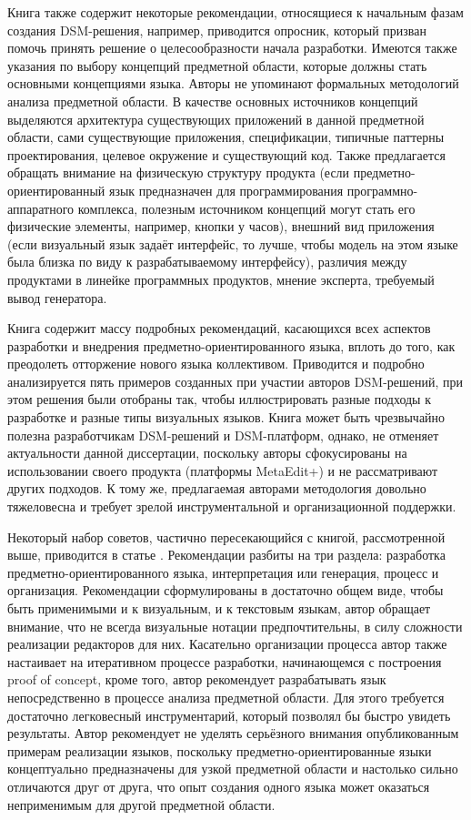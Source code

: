 Книга также содержит некоторые рекомендации, относящиеся к начальным фазам создания 
DSM-решения, например, приводится опросник, который призван помочь принять решение о 
целесообразности начала разработки. Имеются также указания по выбору концепций предметной 
области, которые должны стать основными концепциями языка. Авторы не упоминают формальных 
методологий анализа предметной области. В качестве основных источников концепций выделяются 
архитектура существующих приложений в данной предметной области, сами существующие приложения, 
спецификации, типичные паттерны проектирования, целевое окружение и существующий код.
 Также предлагается обращать внимание на физическую структуру продукта (если предметно-ориентированный 
язык предназначен для программирования программно-аппаратного комплекса, полезным 
источником концепций могут стать его физические элементы, например, кнопки у часов), 
внешний вид приложения (если визуальный язык задаёт интерфейс, то лучше, чтобы модель 
на этом языке была близка по виду к разрабатываемому интерфейсу), различия между продуктами 
в линейке программных продуктов, мнение эксперта, требуемый вывод генератора.

Книга содержит массу подробных рекомендаций, касающихся всех аспектов разработки и 
внедрения предметно-ориентированного языка, вплоть до того, как преодолеть отторжение 
нового языка коллективом. Приводится и подробно анализируется пять примеров созданных 
при участии авторов DSM-решений, при этом решения были отобраны так, чтобы иллюстрировать 
разные подходы к разработке и разные типы визуальных языков. Книга может быть чрезвычайно 
полезна разработчикам DSM-решений и DSM-платформ, однако, не отменяет актуальности 
данной диссертации, поскольку авторы сфокусированы на использовании своего продукта 
(платформы MetaEdit+) и не рассматривают других подходов. К тому же, предлагаемая 
авторами методология довольно тяжеловесна и требует зрелой инструментальной и организационной 
поддержки.

Некоторый набор советов, частично пересекающийся с книгой, рассмотренной выше, приводится 
в статье \cite{voelter2009best}. Рекомендации разбиты на три раздела: разработка предметно-ориентированного 
языка, интерпретация или генерация, процесс и организация. Рекомендации сформулированы 
в достаточно общем виде, чтобы быть применимыми и к визуальным, и к текстовым языкам, автор 
обращает внимание, что не всегда визуальные нотации предпочтительны, в силу сложности 
реализации редакторов для них. Касательно организации процесса автор также настаивает 
на итеративном процессе разработки, начинающемся с построения proof of concept, кроме 
того, автор рекомендует разрабатывать язык непосредственно в процессе анализа предметной 
области. Для этого требуется достаточно легковесный инструментарий, который позволял 
бы быстро увидеть результаты. Автор рекомендует не уделять серьёзного внимания опубликованным 
примерам реализации языков, поскольку предметно-ориентированные языки концептуально 
предназначены для узкой предметной области и настолько сильно отличаются друг от друга, 
что опыт создания одного языка может оказаться неприменимым для другой предметной области.

